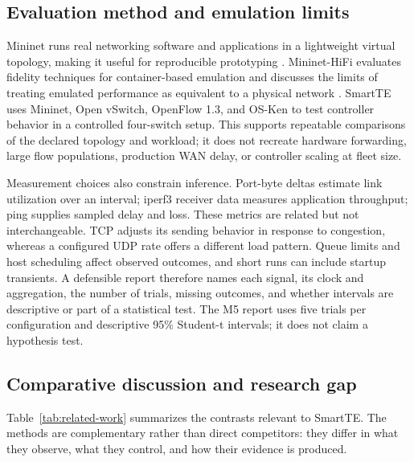 \subsection{Evaluation method and emulation limits}
Mininet runs real networking software and applications in a lightweight virtual topology, making it useful for reproducible prototyping \cite{mininet2010}. Mininet-HiFi evaluates fidelity techniques for container-based emulation and discusses the limits of treating emulated performance as equivalent to a physical network \cite{handigol2012}. SmartTE uses Mininet, Open vSwitch, OpenFlow 1.3, and OS-Ken to test controller behavior in a controlled four-switch setup. This supports repeatable comparisons of the declared topology and workload; it does not recreate hardware forwarding, large flow populations, production WAN delay, or controller scaling at fleet size.

Measurement choices also constrain inference. Port-byte deltas estimate link utilization over an interval; iperf3 receiver data measures application throughput; ping supplies sampled delay and loss. These metrics are related but not interchangeable. TCP adjusts its sending behavior in response to congestion, whereas a configured UDP rate offers a different load pattern. Queue limits and host scheduling affect observed outcomes, and short runs can include startup transients. A defensible report therefore names each signal, its clock and aggregation, the number of trials, missing outcomes, and whether intervals are descriptive or part of a statistical test. The M5 report uses five trials per configuration and descriptive 95\% Student-t intervals; it does not claim a hypothesis test.

\subsection{Comparative discussion and research gap}
Table~\ref{tab:related-work} summarizes the contrasts relevant to SmartTE. The methods are complementary rather than direct competitors: they differ in what they observe, what they control, and how their evidence is produced.

